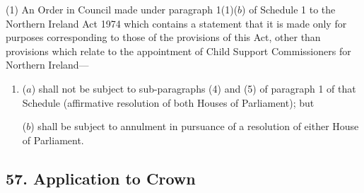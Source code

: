 \documentclass[12pt,a4paper]{article}
\begin{document}
(1) An Order in Council made under paragraph 1(1)($b$)  of Schedule 1 to the Northern Ireland Act 1974 which contains a statement that it is made only for purposes corresponding to those of the provisions of this Act, other than provisions which relate to the appointment of Child Support Commissioners for Northern Ireland—
\begin{enumerate}\item[]
($a$) shall not be subject to sub-paragraphs (4)  and (5)  of paragraph 1 of that Schedule (affirmative resolution of both Houses of Parliament); but

($b$) shall be subject to annulment in pursuance of a resolution of either House of Parliament.
\end{enumerate}

%
%
%
%


\subsection{57. Application to Crown}
\end{document}
